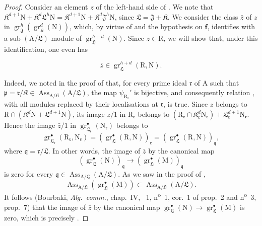 \begin{proof}
Consider an element $z$ of the left-hand side of . We note that $\mathfrak K^{d+1}\mathrm{N}+\mathfrak K^d\mathfrak{L}^h\mathrm{N}=\mathfrak{K}^{d+1}\mathrm{N}+\mathfrak K^d\mathfrak{J}^h\mathrm{N}$, since $\mathfrak{L}=\mathfrak{J}+\mathfrak K$. We consider the class $\bar{z}$ of $z$ in $\operatorname{gr}_\mathfrak{J}^{h}(\operatorname{gr}_\mathfrak{K}^{d}(\mathrm{N}))$, which, by virtue of  and the hypothesis on $\mathbf{f}$, identifies with a sub-$(\mathrm{A}/\mathfrak{L})$-module of $\operatorname{gr}_\mathfrak{L}^{h+d}(\mathrm{N})$. Since $z\in\mathrm{R}$, we will show that, under this identification, one even has

\begin{env}[19.7.1.20]
\label{IV.19.7.1.20}
\[
  \bar{z}\in\operatorname{gr}_\mathfrak{L}^{h+d}(\mathrm{R},\mathrm{N}).
\]
\end{env}

Indeed, we noted in the proof of  that, for every prime ideal $\mathfrak{r}$ of $\mathrm{A}$ such that $\mathfrak{p}=\mathfrak{r}/\mathfrak{K}\in\operatorname{Ass}_{\mathrm{A}/\mathfrak{K}}(\mathrm{A}/\mathfrak{L})$, the map $\psi_{\mathrm{R}_\mathfrak{r}}'$ is bijective, and consequently relation , with all modules replaced by their localisations at $\mathfrak{r}$, is true. Since $z$ belongs to $\mathrm{R}\cap(\mathfrak{K}^d\mathrm{N}+\mathfrak{L}^{d+1}\mathrm{N})$, its image $z/1$ in $\mathrm{R}_\mathfrak{r}$ belongs to $(\mathrm{R}_\mathfrak{r}\cap\mathfrak{K}_\mathfrak{r}^d\mathrm{N}_\mathfrak{r})+\mathfrak{L}_\mathfrak{r}^{d+1}\mathrm{N}_\mathfrak{r}$. Hence the image $\bar{z}/1$ in $\operatorname{gr}_{\mathfrak{L}_\mathfrak{r}}^\bullet(\mathrm{N}_\mathfrak{r})$ belongs to
\[
  \operatorname{gr}_{\mathfrak{L}_\mathfrak{r}}^\bullet(\mathrm{R}_\mathfrak{r},\mathrm{N}_\mathfrak{r})
  =(\operatorname{gr}_\mathfrak{L}^\bullet(\mathrm{R},\mathrm{N}))_\mathfrak{r}
  =(\operatorname{gr}_\mathfrak{L}^\bullet(\mathrm{R},\mathrm{N}))_\mathfrak{q},
\]
where $\mathfrak{q}=\mathfrak{r}/\mathfrak{L}$. In other words, the image of $\bar{z}$ by the canonical map
\[
  (\operatorname{gr}_\mathfrak{L}^\bullet(\mathrm{N}))_\mathfrak{q}
  \longrightarrow
  (\operatorname{gr}_\mathfrak{L}^\bullet(\mathrm{M}))_\mathfrak{q}
\]
is zero for every $\mathfrak{q}\in\operatorname{Ass}_{\mathrm{A}/\mathfrak{L}}(\mathrm{A}/\mathfrak{L})$. As we saw in the proof of ,
\[
  \operatorname{Ass}_{\mathrm{A}/\mathfrak{L}}(\operatorname{gr}_\mathfrak{L}^\bullet(\mathrm{M}))\subset\operatorname{Ass}_{\mathrm{A}/\mathfrak{L}}(\mathrm{A}/\mathfrak{L}).
\]
It follows (Bourbaki, \emph{Alg.~comm.}, chap.~IV, \textsection~1, n\textsuperscript{o}~1, cor.~1 of prop.~2 and n\textsuperscript{o}~3, prop.~7) that the image of $\bar{z}$ by the canonical map $\operatorname{gr}_\mathfrak{L}^\bullet(\mathrm{N})\to\operatorname{gr}_\mathfrak{L}^\bullet(\mathrm{M})$ is zero, which is precisely .


\end{proof}
